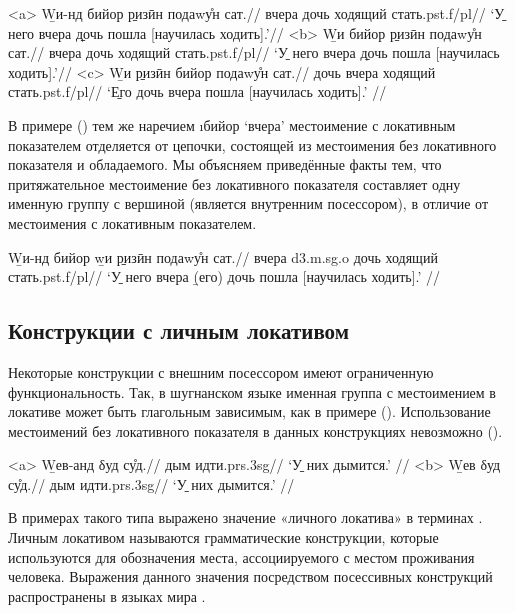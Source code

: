 \a<a> \begingl
\gla \b{Wи-нд} бийор \b{ризӣн} подаwу̊н сат.//
 вчера дочь ходящий стать.{\sc pst.f/pl}//
\glft ‘\b{У него} вчера \b{дочь} пошла [научилась ходить].’//
\endgl
\a<b> \begingl
\gla \ljudge{*}\b{Wи} бийор \b{ризӣн} подаwу̊н сат.//
 вчера дочь ходящий стать.{\sc pst.f/pl}//
 ‘\b{У него} вчера \b{дочь} пошла [научилась ходить].’//
\endgl
\a<c> \begingl
\gla \b{Wи} \b{ризӣн} бийор подаwу̊н сат.//
 дочь вчера ходящий стать.{\sc pst.f/pl}//
\glft ‘\b{Его дочь} вчера пошла [научилась ходить].’ \trailingcitation{[элицитация]}//
\endgl \xe

В примере () тем же наречием \i{бийор} ‘вчера’ местоимение с локативным показателем отделяется от цепочки, состоящей из местоимения без локативного показателя и обладаемого. Мы объясняем приведённые факты тем, что притяжательное местоимение без локативного показателя составляет одну именную группу с вершиной (является внутренним посессором), в отличие от местоимения с локативным показателем.

\begingl
\gla \b{Wи-нд} бийор \b{wи} \b{ризӣн} подаwу̊н сат.//
 вчера {\sc d3.m.sg.o} дочь ходящий стать.{\sc pst.f/pl}//
\glft ‘\b{У него} вчера \b{(его) дочь} пошла [научилась ходить].’ \trailingcitation{[элицитация]}//
\endgl \xe

\subsection{Конструкции с личным локативом}

Некоторые конструкции с внешним посессором имеют ограниченную функциональность. Так, в шугнанском языке именная группа с местоимением в локативе может быть глагольным зависимым, как в примере (). Использование местоимений без локативного показателя в данных конструкциях невозможно ().

\a<a> \begingl
\gla \b{Wев-анд} δуд су̊д.//
 дым идти.{\sc prs.3sg}//
\glft ‘\b{У них} дымится.’ //
\endgl
\a<b> \begingl
\gla \ljudge{*}\b{Wев} δуд су̊д.//
 дым идти.{\sc prs.3sg}//
 ‘\b{У них} дымится.’ \trailingcitation{[элицитация]}//
\endgl \xe

В примерах такого типа выражено значение «личного локатива» в терминах \parencite{daniel2003}. Личным локативом называются грамматические конструкции, которые используются для обозначения места, ассоциируемого с местом проживания человека. Выражения данного значения посредством посессивных конструкций распространены в языках мира \parencite{zhigulskaya2015}.

